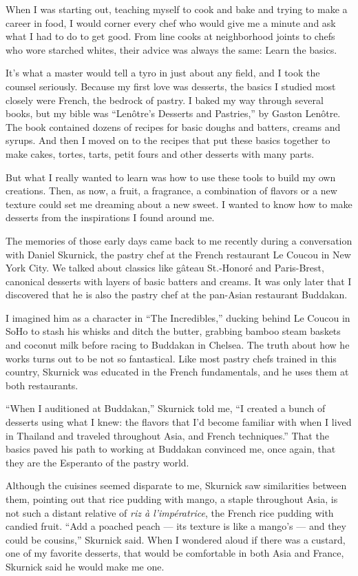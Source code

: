 When I was starting out, teaching myself to cook and bake and trying to
make a career in food, I would corner every chef who would give me a
minute and ask what I had to do to get good. From line cooks at
neighborhood joints to chefs who wore starched whites, their advice was
always the same: Learn the basics.

It's what a master would tell a tyro in just about any field, and I took
the counsel seriously. Because my first love was desserts, the basics I
studied most closely were French, the bedrock of pastry. I baked my way
through several books, but my bible was ``Lenôtre's Desserts and
Pastries,'' by Gaston Lenôtre. The book contained dozens of recipes for
basic doughs and batters, creams and syrups. And then I moved on to the
recipes that put these basics together to make cakes, tortes, tarts,
petit fours and other desserts with many parts.

But what I really wanted to learn was how to use these tools to build my
own creations. Then, as now, a fruit, a fragrance, a combination of
flavors or a new texture could set me dreaming about a new sweet. I
wanted to know how to make desserts from the inspirations I found around
me.

The memories of those early days came back to me recently during a
conversation with Daniel Skurnick, the pastry chef at the French
restaurant Le Coucou in New York City. We talked about classics like
gâteau St.-Honoré and Paris-Brest, canonical desserts with layers of
basic batters and creams. It was only later that I discovered that he is
also the pastry chef at the pan-Asian restaurant Buddakan.

I imagined him as a character in ``The Incredibles,'' ducking behind Le
Coucou in SoHo to stash his whisks and ditch the butter, grabbing bamboo
steam baskets and coconut milk before racing to Buddakan in Chelsea. The
truth about how he works turns out to be not so fantastical. Like most
pastry chefs trained in this country, Skurnick was educated in the
French fundamentals, and he uses them at both restaurants.

``When I auditioned at Buddakan,'' Skurnick told me, ``I created a bunch
of desserts using what I knew: the flavors that I'd become familiar with
when I lived in Thailand and traveled throughout Asia, and French
techniques.'' That the basics paved his path to working at Buddakan
convinced me, once again, that they are the Esperanto of the pastry
world.

Although the cuisines seemed disparate to me, Skurnick saw similarities
between them, pointing out that rice pudding with mango, a staple
throughout Asia, is not such a distant relative of \emph{riz à
l'impératrice}, the French rice pudding with candied fruit. ``Add a
poached peach --- its texture is like a mango's --- and they could be
cousins,'' Skurnick said. When I wondered aloud if there was a custard,
one of my favorite desserts, that would be comfortable in both Asia and
France, Skurnick said he would make me one.

